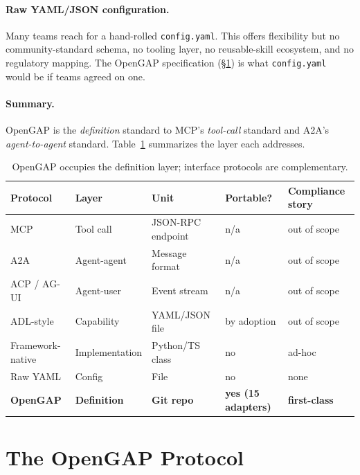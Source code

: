 \documentclass[11pt,a4paper]{article}
\begin{document}
\paragraph{Raw YAML/JSON configuration.}
Many teams reach for a hand-rolled \texttt{config.yaml}. This offers flexibility but no
community-standard schema, no tooling layer, no reusable-skill ecosystem, and no
regulatory mapping. The OpenGAP specification (\S\ref{sec:protocol}) is what
\texttt{config.yaml} would be if teams agreed on one.

\paragraph{Summary.}
OpenGAP is the \emph{definition} standard to MCP's \emph{tool-call} standard and A2A's
\emph{agent-to-agent} standard. Table~\ref{tab:related} summarizes the layer each
addresses.

\begin{table}[h]
\centering
\footnotesize
\begin{tabular}{@{}lllll@{}}
\toprule
Protocol & Layer & Unit & Portable? & Compliance story \\
\midrule
MCP~\cite{mcp2024}         & Tool call      & JSON-RPC endpoint    & n/a          & out of scope \\
A2A~\cite{a2a2024}         & Agent-agent    & Message format       & n/a          & out of scope \\
ACP / AG-UI                & Agent-user     & Event stream         & n/a          & out of scope \\
ADL-style                  & Capability     & YAML/JSON file       & by adoption  & out of scope \\
Framework-native           & Implementation & Python/TS class      & no           & ad-hoc \\
Raw YAML                   & Config         & File                 & no           & none \\
\textbf{OpenGAP}          & \textbf{Definition} & \textbf{Git repo} & \textbf{yes (15 adapters)} & \textbf{first-class} \\
\bottomrule
\end{tabular}
\caption{OpenGAP occupies the definition layer; interface protocols are complementary.}
\label{tab:related}
\end{table}

\section{The OpenGAP Protocol}\label{sec:protocol}
\end{document}
